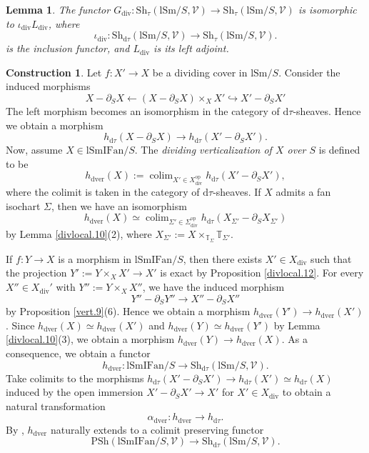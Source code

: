 \documentclass[10pt]{amsart}
\newtheorem{lem}[thm]{Lemma}
\theoremstyle{definition}
\newtheorem{const}[thm]{Construction}
\theoremstyle{remark}
\numberwithin{equation}{subsection}
\newcommand{\T}{\mathbb{T}}
\newcommand{\cV}{\mathcal{V}}
\newcommand{\colimit}{\mathop{\mathrm{colim}}}
\newcommand{\lSm}{\mathrm{lSm}}
\newcommand{\lSmIFan}{\mathrm{lSmIFan}}
\newcommand{\infPsh}{\mathrm{PSh}}
\newcommand{\infShv}{\mathrm{Sh}}
\newcommand{\op}{\mathrm{op}}
\newcommand{\dver}{\mathrm{dver}}
\newcommand{\divi}{\mathrm{div}}
\newcommand{\dtau}{\mathrm{d}\tau}
\begin{document}
\begin{lem}
\label{divlocal.13}
The functor $G_{\divi}\colon \infShv_{\tau}(\lSm/S,\cV)
\to
\infShv_{\tau}(\lSm/S,\cV)$ is isomorphic to $\iota_{\divi} L_{\divi}$, where  
\[
\iota_{\divi}
\colon
\infShv_{\dtau}(\lSm/S,\cV)
\to
\infShv_{\tau}(\lSm/S,\cV).
\]
is the inclusion functor,
and $L_{\divi}$ is its left adjoint.
\end{lem}

\begin{const}
\label{divlocal.2}
Let $f\colon X'\to X$ be a dividing cover in $\lSm/S$.
Consider the induced morphisms
\[
X-\partial_S X
\leftarrow
(X-\partial_S X)\times_X X'
\hookrightarrow
X'-\partial_S X'
\]
The left morphism becomes an isomorphism in the category of $\dtau$-sheaves.
Hence we obtain a morphism
\[
h_{\dtau}(X-\partial_S X)
\to
h_{\dtau}(X'-\partial_S X').
\]
Now, assume $X\in \lSmIFan/S$.
The \emph{dividing verticalization of $X$ over $S$} is defined to be
\begin{equation}
\label{divlocal.2.8}
h_{\dver}(X)
:=
\colimit_{X'\in X_{\divi}^{\op}}
h_{\dtau}(X'-\partial_S X'),
\end{equation}
where the colimit is taken in the category of $\dtau$-sheaves.
If $X$ admits a fan isochart $\Sigma$, then we have an isomorphism
\begin{equation}
h_{\dver}(X)
\simeq
\colimit_{\Sigma'\in \Sigma_{\divi}^{\op}}
h_{\dtau}(X_{\Sigma'}-\partial_S X_{\Sigma'})
\end{equation}
by Lemma \ref{divlocal.10}(2), where $X_{\Sigma'}:=X\times_{\T_\Sigma}\T_{\Sigma'}$.

If $f\colon Y\to X$ is a morphism in $\lSmIFan/S$, then there exists $X'\in X_{\divi}$ such that the projection $Y':=Y\times_X X'\to X'$ is exact by Proposition \ref{divlocal.12}.
For every $X''\in X_{\divi}'$ with $Y'':=Y\times_X X''$, we have the induced morphism
\[
Y''-\partial_S Y''\to X''-\partial_S X''
\]
by Proposition \ref{vert.9}(6).
Hence we obtain a morphism $h_{\dver}(Y')\to h_{\dver}(X')$.
Since $h_{\dver}(X)\simeq h_{\dver}(X')$ and $h_{\dver}(Y)\simeq h_{\dver}(Y')$ by Lemma \ref{divlocal.10}(3), we obtain a morphism $h_{\dver}(Y)\to h_{\dver}(X)$.
As a consequence, we obtain a functor
\[
h_{\dver}
\colon
\lSmIFan/S
\to
\infShv_{\dtau}(\lSm/S,\cV).
\]
Take colimits to the morphisms $h_{\dtau}(X'-\partial_S X')\to h_{\dtau}(X')\simeq h_{\dtau}(X)$ induced by the open immersion $X'-\partial_S X'\to X'$ for $X'\in X_{\divi}$ to obtain a natural transformation
\begin{equation}
\label{divlocal.2.5}
\alpha_{\dver}\colon h_{\dver}\to h_{\dtau}.
\end{equation}
By \cite[Theorem 5.1.5.6]{HTT}, $h_{\dver}$ naturally extends to a colimit preserving functor
\begin{equation}
\label{divlocal.2.1}
\infPsh(\lSmIFan/S,\cV)
\to
\infShv_{\dtau}(\lSm/S,\cV).
\end{equation}
\end{const}
\end{document}
